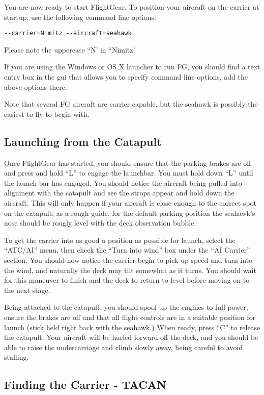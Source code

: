 You are now ready to start FlightGear. To position your aircraft on the carrier at startup,
use the following command line options:

\begin{verbatim}
--carrier=Nimitz --aircraft=seahawk
\end{verbatim}

Please note the uppercase ``N' in ``Nimitz'.

If you are using the Windows or OS X launcher to run FG, you should find a text entry box in the gui that
allows you to specify command line options, add the above options there.

Note that several FG aircraft are carrier capable, but the seahawk is possibly the easiest to fly to begin with.

\subsection{Launching from the Catapult}

Once FlightGear has started, you should ensure that the parking brakes are off and press and hold ``L'' to
engage the launchbar. You must hold down ``L'' until the launch bar has engaged.
You should notice the aircraft being pulled into alignment with the catapult and see
the strops appear and hold down the aircraft.  This will only happen if your aircraft is
close enough to the correct spot on the catapult; as a rough guide, for the default
parking position the seahawk's nose should be rougly level with the deck observation bubble.

To get the carrier into as good a position as possible for launch, select the ``ATC/AI'' menu, then
check the ``Turn into wind'' box under the ``AI Carrier'' section. You should now notice the carrier
begin to pick up speed and turn into the wind, and naturally the deck may tilt somewhat as it turns.
You should wait for this maneuver to finish and the deck to return to level before moving on to the next stage.

Being attached to the catapult, you should spool up the engines to full power, ensure the brakes are off
and that all flight controls are in a suitable position for launch (stick held right back with the seahawk.)
When ready, press ``C'' to release the catapult. Your aircraft will be hurled forward off the deck, and
you should be able to raise the undercarriage and climb slowly away, being careful to avoid stalling.

\subsection{Finding the Carrier - TACAN}

